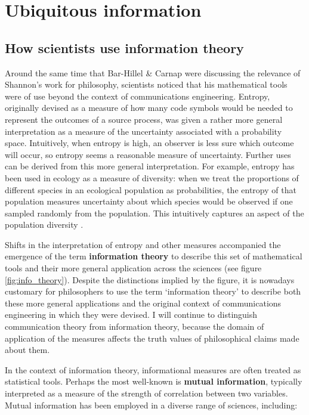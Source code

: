 \section{Ubiquitous information}\label{sec:ubiquitous}

\subsection{How scientists use information theory}\label{subsec:scientists}

Around the same time that Bar-Hillel \& Carnap were discussing the relevance of Shannon's work for philosophy, scientists noticed that his mathematical tools were of use beyond the context of communications engineering.
Entropy, originally devised as a measure of how many code symbols would be needed to represent the outcomes of a source process, was given a rather more general interpretation as a measure of the uncertainty associated with a probability space.
Intuitively, when entropy is high, an observer is less sure which outcome will occur, so entropy seems a reasonable measure of uncertainty.
Further uses can be derived from this more general interpretation.
For example, entropy has been used in ecology as a measure of diversity: when we treat the proportions of different species in an ecological population as probabilities, the entropy of that population measures uncertainty about which species would be observed if one sampled randomly from the population.
This intuitively captures an aspect of the population diversity \citep{margalef1957information}.

Shifts in the interpretation of entropy and other measures accompanied the emergence of the term \textbf{information theory} to describe this set of mathematical tools and their more general application across the sciences (see figure \ref{fig:info_theory}).
Despite the distinctions implied by the figure, it is nowadays customary for philosophers to use the term `information theory' to describe both these more general applications and the original context of communications engineering in which they were devised.
I will continue to distinguish communication theory from information theory, because the domain of application of the measures affects the truth values of philosophical claims made about them.



In the context of information theory, informational measures are often treated as statistical tools.
Perhaps the most well-known is \textbf{mutual information}, typically interpreted as a measure of the strength of correlation between two variables.
Mutual information has been employed in a diverse range of sciences, including:

